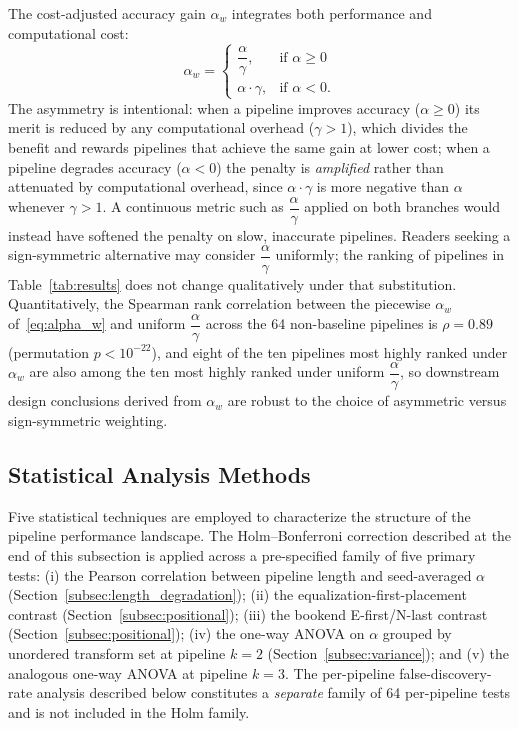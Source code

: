 \documentclass[preprint,5p,times,twocolumn]{elsarticle}
\begin{document}
The cost-adjusted accuracy gain $\alpha_w$ integrates both performance and computational cost:
\begin{equation}
\alpha_w =
\begin{cases}
\dfrac{\alpha}{\gamma}, & \text{if } \alpha \geq 0 \\[0.4em]
\alpha \cdot \gamma, & \text{if } \alpha < 0.
\end{cases}
\label{eq:alpha_w}
\end{equation}
The asymmetry is intentional: when a pipeline improves accuracy ($\alpha \geq 0$) its merit is reduced by any computational overhead ($\gamma > 1$), which divides the benefit and rewards pipelines that achieve the same gain at lower cost; when a pipeline degrades accuracy ($\alpha < 0$) the penalty is \emph{amplified} rather than attenuated by computational overhead, since $\alpha \cdot \gamma$ is more negative than $\alpha$ whenever $\gamma > 1$. A continuous metric such as $\dfrac{\alpha}{\gamma}$ applied on both branches would instead have softened the penalty on slow, inaccurate pipelines. Readers seeking a sign-symmetric alternative may consider $\dfrac{\alpha}{\gamma}$ uniformly; the ranking of pipelines in Table~\ref{tab:results} does not change qualitatively under that substitution. Quantitatively, the Spearman rank correlation between the piecewise $\alpha_w$ of~\eqref{eq:alpha_w} and uniform $\dfrac{\alpha}{\gamma}$ across the 64 non-baseline pipelines is $\rho = 0.89$ (permutation $p < 10^{-22}$), and eight of the ten pipelines most highly ranked under $\alpha_w$ are also among the ten most highly ranked under uniform $\dfrac{\alpha}{\gamma}$, so downstream design conclusions derived from $\alpha_w$ are robust to the choice of asymmetric versus sign-symmetric weighting.

\subsection{Statistical Analysis Methods}
\label{subsec:stats}

Five statistical techniques are employed to characterize the structure of the pipeline performance landscape. The Holm--Bonferroni correction described at the end of this subsection is applied across a pre-specified family of five primary tests: (i) the Pearson correlation between pipeline length and seed-averaged $\alpha$ (Section~\ref{subsec:length_degradation}); (ii) the equalization-first-placement contrast (Section~\ref{subsec:positional}); (iii) the bookend E-first/N-last contrast (Section~\ref{subsec:positional}); (iv) the one-way ANOVA on $\alpha$ grouped by unordered transform set at pipeline $k=2$ (Section~\ref{subsec:variance}); and (v) the analogous one-way ANOVA at pipeline $k=3$. The per-pipeline false-discovery-rate analysis described below constitutes a \emph{separate} family of 64 per-pipeline tests and is not included in the Holm family.
\end{document}
